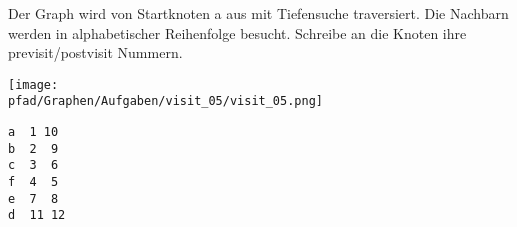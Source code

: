 \question[3]
Der Graph wird von Startknoten a aus mit Tiefensuche traversiert. Die
  Nachbarn werden in alphabetischer Reihenfolge besucht.
  Schreibe an die Knoten ihre previsit/postvisit Nummern.

\texttt{[image: \\pfad/Graphen/Aufgaben/visit\_05/visit\_05.png]}

\ifprintanswers

\begin{lstlisting}
a  1 10
b  2  9
c  3  6
f  4  5
e  7  8
d  11 12
\end{lstlisting}

\fi
